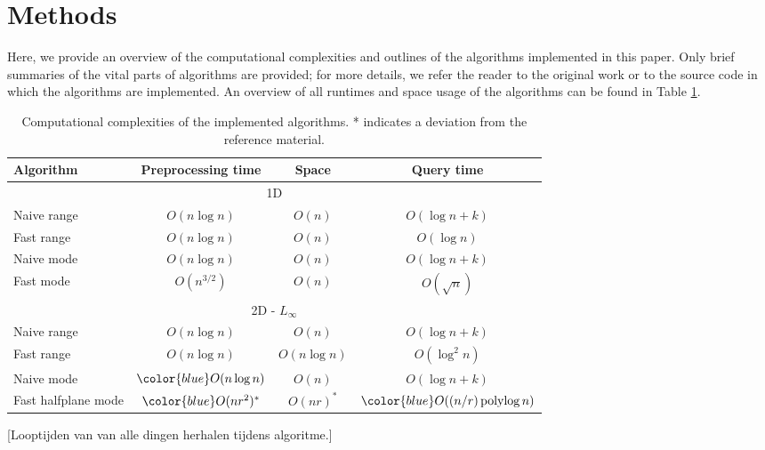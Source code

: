 \documentclass{article}
\newcommand{\todo}[1]{{\color{red}[#1]}}
\newcommand{\fb}[1]{{\color{blue}#1}}
\DeclareMathOperator{\polylog}{polylog}
\begin{document}
\section{Methods}
Here, we provide an overview of the computational complexities and outlines of
the algorithms implemented in this paper. Only brief summaries of the vital
parts of algorithms are provided; for more details, we refer the reader to the
original work or to the source code in which the algorithms are implemented. An
overview of all runtimes and space usage of the algorithms can be found in
Table \ref{tab:runtimes}.
\begin{table}[h]
    \centering
    \begin{tabular}{|l|ccc|}
        \hline
        Algorithm   & Preprocessing time & Space         & Query time                 \\
        \hline
        \hline
        \multicolumn{4}{|c|}{1D}                                                      \\
        \hline
        Naive range & $O(n \log n)$      & $O(n)$        & $O(\log n + k)$            \\
        Fast range  & $O(n \log n)$      & $O(n)$        & $O(\log n)$                \\
        Naive mode  & \fb{$O(n \log n)$} & \fb{$O(n)$}   & \fb{$O(\log n + k)$}       \\
        Fast mode   & $O(n^{3/2})$       & $O(n)$        & $O(\sqrt{n})$              \\
        \hline
        \multicolumn{4}{|c|}{2D - $L_\infty$}                                         \\
        \hline
        Naive range & $O(n \log n)$      & $O(n)$        & $O(\log n + k)$            \\
        Fast range  & $O(n \log n)$      & $O(n \log n)$ & $O(\log^2 n)$              \\
        Naive mode  & $\fb{O(n \log n)}$ & $O(n)$        & \fb{$O(\log n + k)$}       \\
        Fast halfplane mode   & $\fb{O(nr^2)^*}$   & $O(nr)^*$     & $\fb{O((n/r) \polylog n)}$ \\
        \hline
    \end{tabular}
    \caption{Computational complexities of the implemented algorithms. * indicates a deviation from the reference material.}
    \label{tab:runtimes}
\end{table}
\todo{Looptijden van van alle dingen herhalen tijdens algoritme.}\\
\end{document}
